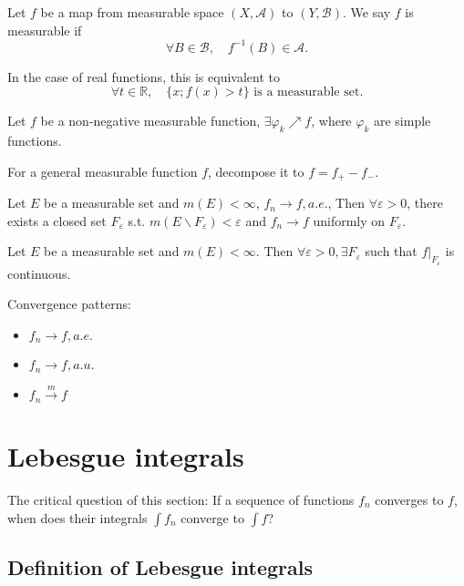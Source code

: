 \begin{definition}
	Let $f$ be a map from measurable space $(X, \mathcal{A})$ to $(Y, \mathcal{B})$.
	We say $f$ is measurable if
	 \[
	\forall B\in \mathcal{B}, \quad f^{-1}(B)\in \mathcal{A}
	.\]
	
	In the case of real functions, this is equivalent to
	\[
		\forall t\in \mathbb{R}, \quad \{x; f(x)>t\} \text{ is a measurable set}
	.\]
\end{definition}

\begin{proposition}
    Let $f$ be a non-negative measurable function,
	$\exists \varphi_k \nearrow f$,
	where $\varphi_k$ are simple functions.

	For a general measurable function $f$, decompose it to $f=f_+-f_-$. 
\end{proposition}

\begin{theorem}[Egorov]
    Let $E$ be a measurable set and $m(E)<\infty$, $f_n\to f, a.e.$,
	Then  $\forall\varepsilon>0$, there exists a closed set $F_\varepsilon$ s.t.
	$m(E\backslash F_{\varepsilon})<\varepsilon$ and
	$f_n\to f$ uniformly on $F_{\varepsilon}$.
\end{theorem}

\begin{theorem}[Lusin]
    Let $E$ be a measurable set and  $m(E)<\infty$.
	Then $\forall \varepsilon>0, \exists F_{\varepsilon}$ such that
	$f \big|_{F_\varepsilon}$ is continuous.
\end{theorem}

Convergence patterns:
\begin{itemize}
	\item $f_n\to f, a.e.$
	\item  $f_n\to f, a.u.$
	\item  $f_n\xrightarrow{m} f$
\end{itemize}

\section{Lebesgue integrals}
\label{sec:Lebesgue integrals}
The critical question of this section:
If a sequence of functions $f_n$ converges to  $f$, when does their
integrals $\int f_n$ converge to  $\int f$? 

\subsection{Definition of Lebesgue integrals}
\label{sub:Definition of Lebesgue integrals}

